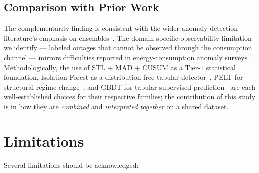 \documentclass{article}
\begin{document}
\subsection{Comparison with Prior Work}
The complementarity finding is consistent with the wider anomaly-detection literature's emphasis on ensembles~\cite{aggarwal2017ensemble,ahmad2017realtime}. The domain-specific observability limitation we identify --- labeled outages that cannot be observed through the consumption channel --- mirrors difficulties reported in energy-consumption anomaly surveys~\cite{himeur2021survey}. Methodologically, the use of STL + MAD + CUSUM as a Tier-$1$ statistical foundation, Isolation Forest as a distribution-free tabular detector~\cite{liu2008isolation}, PELT for structural regime change~\cite{killick2012pelt,truong2020ruptures}, and GBDT for tabular supervised prediction~\cite{friedman2001gbm,shwartz2022tabular} are each well-established choices for their respective families; the contribution of this study is in how they are \emph{combined} and \emph{interpreted together} on a shared dataset.

\section{Limitations}\label{sec:limitations}
Several limitations should be acknowledged:
\end{document}
